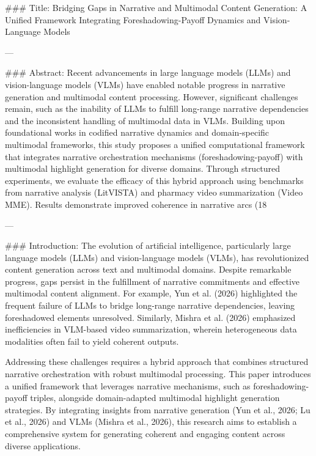 ### Title:
Bridging Gaps in Narrative and Multimodal Content Generation: A Unified Framework Integrating Foreshadowing-Payoff Dynamics and Vision-Language Models

---

### Abstract:
Recent advancements in large language models (LLMs) and vision-language models (VLMs) have enabled notable progress in narrative generation and multimodal content processing. However, significant challenges remain, such as the inability of LLMs to fulfill long-range narrative dependencies and the inconsistent handling of multimodal data in VLMs. Building upon foundational works in codified narrative dynamics and domain-specific multimodal frameworks, this study proposes a unified computational framework that integrates narrative orchestration mechanisms (foreshadowing-payoff) with multimodal highlight generation for diverse domains. Through structured experiments, we evaluate the efficacy of this hybrid approach using benchmarks from narrative analysis (LitVISTA) and pharmacy video summarization (Video MME). Results demonstrate improved coherence in narrative arcs (18%

---

### Introduction:
The evolution of artificial intelligence, particularly large language models (LLMs) and vision-language models (VLMs), has revolutionized content generation across text and multimodal domains. Despite remarkable progress, gaps persist in the fulfillment of narrative commitments and effective multimodal content alignment. For example, Yun et al. (2026) highlighted the frequent failure of LLMs to bridge long-range narrative dependencies, leaving foreshadowed elements unresolved. Similarly, Mishra et al. (2026) emphasized inefficiencies in VLM-based video summarization, wherein heterogeneous data modalities often fail to yield coherent outputs.

Addressing these challenges requires a hybrid approach that combines structured narrative orchestration with robust multimodal processing. This paper introduces a unified framework that leverages narrative mechanisms, such as foreshadowing-payoff triples, alongside domain-adapted multimodal highlight generation strategies. By integrating insights from narrative generation (Yun et al., 2026; Lu et al., 2026) and VLMs (Mishra et al., 2026), this research aims to establish a comprehensive system for generating coherent and engaging content across diverse applications.

